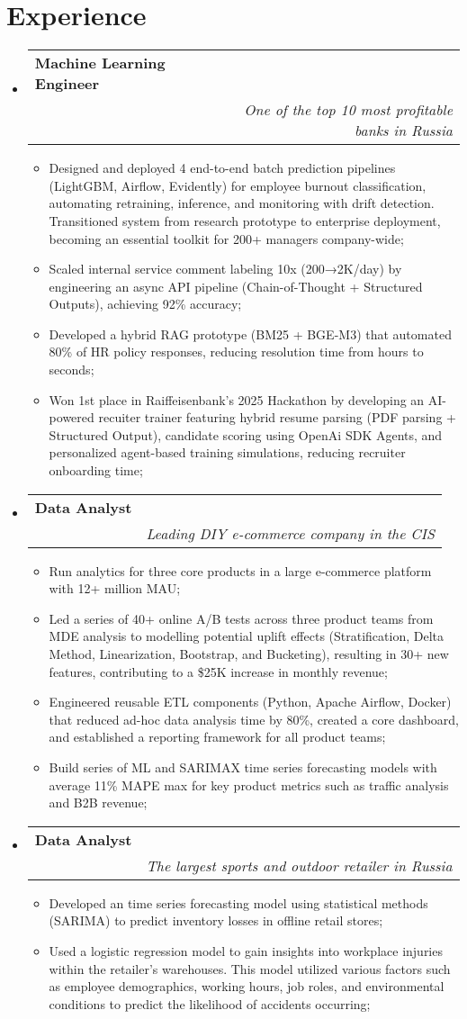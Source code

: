 \documentclass[letterpaper,11pt]{article}
\makeatletter
\newcommand{\resumeItem}[1]{
  \item\small{#1}
}
\newcommand{\resumeSubheading}[4]{
  \vspace{-4pt}\item
    \begin{tabular*}{0.97\textwidth}[t]{l@{\extracolsep{\fill}}r}
      \textbf{#1} & \normalfont{#2} \\[1pt]
      \normalfont{#3} & \textit{#4} \\
    \end{tabular*}\vspace{-4pt}
}
\newcommand{\resumeSubHeadingListStart}{\begin{itemize}[leftmargin=0.15in, label={}]}
\newcommand{\resumeSubHeadingListEnd}{\end{itemize}}
\newcommand{\resumeItemListStart}{\begin{itemize}}
\newcommand{\resumeItemListEnd}{\end{itemize}}
\makeatother
\begin{document}
\section{Experience}
  \resumeSubHeadingListStart
    \resumeSubheading
      {Machine Learning Engineer}{Jun 2024 -- Present}
      {Raiffeisenbank}{One of the top 10 most profitable banks in Russia}
        \resumeItemListStart
          \resumeItem{Designed and deployed 4 end-to-end batch prediction pipelines (LightGBM, Airflow, Evidently) for employee burnout classification, automating retraining, inference, and monitoring with drift detection. Transitioned system from research prototype to enterprise deployment, becoming an essential toolkit for 200+ managers company-wide;}
          \resumeItem{Scaled internal service comment labeling 10x (200→2K/day) by engineering an async API pipeline (Chain-of-Thought + Structured Outputs), achieving 92\% accuracy;}
          \resumeItem{Developed a hybrid RAG prototype (BM25 + BGE-M3) that automated 80\% of HR policy responses, reducing resolution time from hours to seconds;}
          \resumeItem{Won 1st place in Raiffeisenbank's 2025 Hackathon by developing an AI-powered recuiter trainer featuring hybrid resume parsing (PDF parsing + Structured Output), candidate scoring using OpenAi SDK Agents, and personalized agent-based training simulations, reducing recruiter onboarding time;}
        \resumeItemListEnd
    \resumeSubheading
      {Data Analyst}{Jun 2023 -- Feb 2024}
      {VseInstrumenti.ru}{Leading DIY e-commerce company in the CIS}
        \resumeItemListStart
          \resumeItem{Run analytics for three core products in a large e-commerce platform with 12+ million MAU;}
          \resumeItem{Led a series of 40+ online A/B tests across three product teams from MDE analysis to modelling potential uplift effects (Stratification, Delta Method, Linearization, Bootstrap, and Bucketing), resulting in 30+ new features, contributing to a \$25K increase in monthly revenue;}
          \resumeItem{Engineered reusable ETL components (Python, Apache Airflow, Docker) that reduced ad-hoc data analysis time by 80\%, created a core dashboard, and established a reporting framework for all product teams;}
          \resumeItem{Build series of ML and SARIMAX time series forecasting models with average 11\% MAPE max for key product metrics such as traffic analysis and B2B revenue;}
        \resumeItemListEnd
    \resumeSubheading
      {Data Analyst}{Jan 2023 -- Jun 2023}
      {Sportmaster}{The largest sports and outdoor retailer in Russia}
        \resumeItemListStart
        \resumeItem{Developed an time series forecasting model using statistical methods (SARIMA) to predict inventory losses in offline retail stores;}
        \resumeItem{Used a logistic regression model to gain insights into workplace injuries within the retailer's warehouses. This model utilized various factors such as employee demographics, working hours, job roles, and environmental conditions to predict the likelihood of accidents occurring;}
      \resumeItemListEnd
  \resumeSubHeadingListEnd
\end{document}
